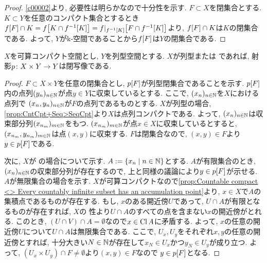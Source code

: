 \documentclass[uplatex, dvipdfmx, a4paper, 12pt, class=jsbook, crop=false]{standalone}
\begin{document}
\begin{proof}
	\cref{c00002}より, 必要性は明らかなので十分性を示す.
	$ F \subset X $を閉集合とする. $ K \subset Y $を任意のコンパクト集合とするとき
	$ \mapset{f}{F} \cap K = \mapset{f}{K \cap \mapinvset{f}{K}}
	= \mapset{f|_{\mapinvset{f}{K}}}{F \cap  \mapinvset{f}{K}} $より,
	$ \mapset{f}{F} \cap K $は$ K $の閉集合である.
	よって, $ Y $がk-空間であることから$ \mapset{f}{F} $は$ Y $の閉集合である.
\end{proof}

\begin{proposition}
	$ X $を可算コンパクト空間とし, $ Y $を列型空間とする. $ X $が列型または  であれば,
	射影$ p\colon X \times Y\to Y $は閉写像である.
\end{proposition}

\begin{proof}
	$ F \subset X \times Y $を任意の閉集合とし, $ \mapset{p}{F} $が列型閉集合であることを示す.
	$ \mapset{p}{F} $内の点列$ (y_n)_{n \in \mathbb{N}} $が点$ y \in Y $に収束しているとする.
	ここで, $ (x_n)_{n \in \mathbb{N}} $を$ X $における点列で
	$ (x_n, y_n)_{n \in \mathbb{N}}  $が$ F $の点列であるものとする.
	$ X $が列型の場合, \cref{prop:CntCpt+Seq>SeqCpt}より$ X $は点列コンパクトである.
	よって, $ (x_n)_{n \in \mathbb{N}} $は収束部分列$ (x_{n_m})_{m \in \mathbb{N}} $をもつ.
	$ (x_{n_m})_{m \in \mathbb{N}} $が点$ x \in X $に収束しているとすると,
	$ (x_{n_m}, y_{n_m})_{m \in \mathbb{N}} $は点$ (x, y) $に収束する.
	$ F $は閉集合なので, $ (x, y) \in F $より$ y \in \mapset{p}{F} $である.

	次に, $ X $が  の場合について示す.
	$ A \defeq \setcomp{x_n}{n \in \N} $とする.
	$ A $が有限集合のとき, $ (x_n)_{n \in \mathbb{N}} $の収束部分列が存在するので,
	上と同様の議論により$ y \in \mapset{p}{F} $が示せる.
	$ A $が無限集合の場合を示す.
	$ X $が可算コンパクトなので\cref{prop:Countable compact <> Every countably infinite subset has an accumulation point}より,
	$ x \in X $で$ A $の集積点であるものが存在する.
	もし, $ x $のある開近傍$ U $であって, $ U \cap A $が有限となるものが存在すれば,
	$ X $の  性より$ U \cap A $のすべての点を含まない$ x $の開近傍がとれる.
	このとき, $ (U \cap V) \cap A = \emptyset $なので$ x \in \mathop{\mathrm{Cl}}\nolimits A $に矛盾する.
	よって, $ x $の任意の開近傍$ U $について$ U \cap A $は無限集合である.
	ここで, $ U_x, U_y $をそれぞれ$ x, y $の任意の開近傍とすれば,
	十分大きい$ N \in \mathbb{N} $が存在して$ x_N \in U_x $かつ$ y_N \in U_y $が成り立つ.
	よって, $ (U_x \times U_y) \cap F \neq \emptyset $より$ (x, y) \in F $なので
	$ y \in \mapset{p}{F} $となる.
\end{proof}
\end{document}
